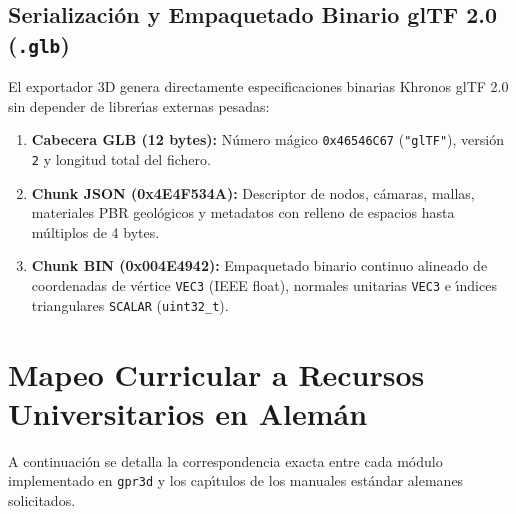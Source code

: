 \documentclass[11pt,a4paper]{article}
\begin{document}
\subsection{Serializaci{\'o}n y Empaquetado Binario glTF 2.0 (\texttt{.glb})}
El exportador 3D genera directamente especificaciones binarias Khronos glTF 2.0 sin depender de librer{\'\i}as externas pesadas:
\begin{enumerate}
    \item \textbf{Cabecera GLB (12 bytes):} N{\'u}mero m{\'a}gico \texttt{0x46546C67} (\texttt{"glTF"}), versi{\'o}n \texttt{2} y longitud total del fichero.
    \item \textbf{Chunk JSON (0x4E4F534A):} Descriptor de nodos, c{\'a}maras, mallas, materiales PBR geol{\'o}gicos y metadatos con relleno de espacios hasta m{\'u}ltiplos de 4 bytes.
    \item \textbf{Chunk BIN (0x004E4942):} Empaquetado binario continuo alineado de coordenadas de v{\'e}rtice \texttt{VEC3} (IEEE float), normales unitarias \texttt{VEC3} e {\'\i}ndices triangulares \texttt{SCALAR} (\texttt{uint32\_t}).
\end{enumerate}

\section{Mapeo Curricular a Recursos Universitarios en Alem{\'a}n}

A continuaci{\'o}n se detalla la correspondencia exacta entre cada m{\'o}dulo implementado en \texttt{gpr3d} y los cap{\'\i}tulos de los manuales est{\'a}ndar alemanes solicitados.
\end{document}
